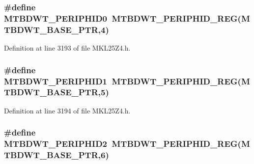 \subsubsection[{\texorpdfstring{M\+T\+B\+D\+W\+T\+\_\+\+P\+E\+R\+I\+P\+H\+I\+D0}{MTBDWT_PERIPHID0}}]{\setlength{\rightskip}{0pt plus 5cm}\#define M\+T\+B\+D\+W\+T\+\_\+\+P\+E\+R\+I\+P\+H\+I\+D0~{\bf M\+T\+B\+D\+W\+T\+\_\+\+P\+E\+R\+I\+P\+H\+I\+D\+\_\+\+R\+EG}({\bf M\+T\+B\+D\+W\+T\+\_\+\+B\+A\+S\+E\+\_\+\+P\+TR},4)}\hypertarget{group___m_t_b_d_w_t___register___accessor___macros_ga07083686c100d0c9d3690d13bf1e6283}{}\label{group___m_t_b_d_w_t___register___accessor___macros_ga07083686c100d0c9d3690d13bf1e6283}


Definition at line 3193 of file M\+K\+L25\+Z4.\+h.

\subsubsection[{\texorpdfstring{M\+T\+B\+D\+W\+T\+\_\+\+P\+E\+R\+I\+P\+H\+I\+D1}{MTBDWT_PERIPHID1}}]{\setlength{\rightskip}{0pt plus 5cm}\#define M\+T\+B\+D\+W\+T\+\_\+\+P\+E\+R\+I\+P\+H\+I\+D1~{\bf M\+T\+B\+D\+W\+T\+\_\+\+P\+E\+R\+I\+P\+H\+I\+D\+\_\+\+R\+EG}({\bf M\+T\+B\+D\+W\+T\+\_\+\+B\+A\+S\+E\+\_\+\+P\+TR},5)}\hypertarget{group___m_t_b_d_w_t___register___accessor___macros_ga9e516a8106ad8dbb2c338a2727a6b309}{}\label{group___m_t_b_d_w_t___register___accessor___macros_ga9e516a8106ad8dbb2c338a2727a6b309}


Definition at line 3194 of file M\+K\+L25\+Z4.\+h.

\subsubsection[{\texorpdfstring{M\+T\+B\+D\+W\+T\+\_\+\+P\+E\+R\+I\+P\+H\+I\+D2}{MTBDWT_PERIPHID2}}]{\setlength{\rightskip}{0pt plus 5cm}\#define M\+T\+B\+D\+W\+T\+\_\+\+P\+E\+R\+I\+P\+H\+I\+D2~{\bf M\+T\+B\+D\+W\+T\+\_\+\+P\+E\+R\+I\+P\+H\+I\+D\+\_\+\+R\+EG}({\bf M\+T\+B\+D\+W\+T\+\_\+\+B\+A\+S\+E\+\_\+\+P\+TR},6)}\hypertarget{group___m_t_b_d_w_t___register___accessor___macros_ga823bbdb0a6008b9e4be7ff1646a8ec41}{}\label{group___m_t_b_d_w_t___register___accessor___macros_ga823bbdb0a6008b9e4be7ff1646a8ec41}


